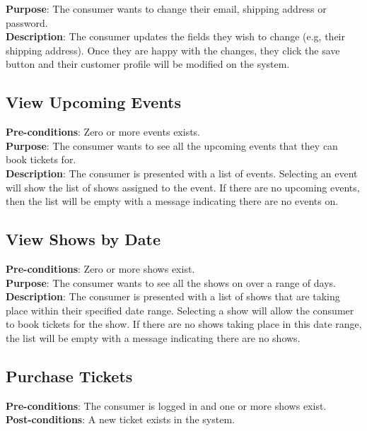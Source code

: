 \textbf{Purpose}: The consumer wants to change their email, shipping
address or password.\\

\textbf{Description}: The consumer updates the fields they wish to
change (e.g, their shipping address). Once they are happy with the
changes, they click the save button and their customer profile will
be modified on the system.

\subsection{View Upcoming Events}
\textbf{Pre-conditions}: Zero or more events exists.\\

\textbf{Purpose}: The consumer wants to see all the upcoming events
that they can book tickets for.\\

\textbf{Description}: The consumer is presented with a list of
events. Selecting an event will show the list of shows assigned to
the event. If there are no upcoming events, then the list will be
empty with a message indicating there are no events on.

\subsection{View Shows by Date}
\textbf{Pre-conditions}: Zero or more shows exist.\\

\textbf{Purpose}: The consumer wants to see all the shows on over a
range of days.\\

\textbf{Description}: The consumer is presented with a list of shows
that are taking place within their specified date range. Selecting
a show will allow the consumer to book tickets for the show. If
there are no shows taking place in this date range, the list will be
empty with a message indicating there are no shows.

\subsection{Purchase Tickets}
\textbf{Pre-conditions}: The consumer is logged in and one or more
shows exist.\\

\textbf{Post-conditions}: A new ticket exists in the system.\\

